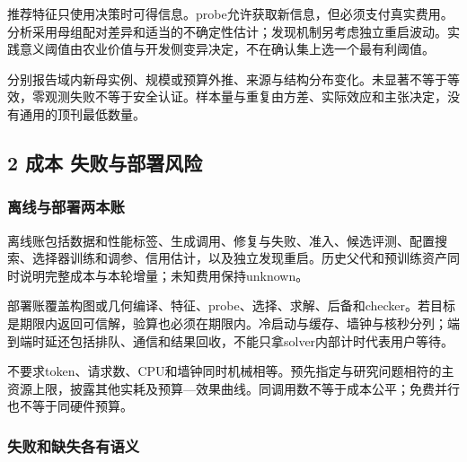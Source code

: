 \documentclass[11pt,a4paper]{article}
\newcommand{\bodytext}[1]{#1\par}
\begin{document}
\bodytext{推荐特征只使用决策时可得信息。probe允许获取新信息，但必须支付真实费用。分析采用母组配对差异和适当的不确定性估计；发现机制另考虑独立重启波动。实践意义阈值由农业价值与开发侧变异决定，不在确认集上选一个最有利阈值。}
\bodytext{分别报告域内新母实例、规模或预算外推、来源与结构分布变化。未显著不等于等效，零观测失败不等于安全认证。样本量与重复由方差、实际效应和主张决定，没有通用的顶刊最低数量。}
\subsection{2  成本 失败与部署风险}
\subsubsection{离线与部署两本账}
\bodytext{离线账包括数据和性能标签、生成调用、修复与失败、准入、候选评测、配置搜索、选择器训练和调参、信用估计，以及独立发现重启。历史父代和预训练资产同时说明完整成本与本轮增量；未知费用保持unknown。}
\bodytext{部署账覆盖构图或几何编译、特征、probe、选择、求解、后备和checker。若目标是期限内返回可信解，验算也必须在期限内。冷启动与缓存、墙钟与核秒分列；端到端时延还包括排队、通信和结果回收，不能只拿solver内部计时代表用户等待。}
\bodytext{不要求token、请求数、CPU和墙钟同时机械相等。预先指定与研究问题相符的主资源上限，披露其他实耗及预算—效果曲线。同调用数不等于成本公平；免费并行也不等于同硬件预算。}
\subsubsection{失败和缺失各有语义}
\begingroup
\fontsize{9.6}{14.6}\selectfont
\setlength{\tabcolsep}{4pt}
\renewcommand{\arraystretch}{1.18}
\end{document}
